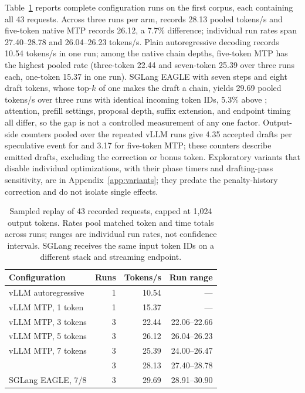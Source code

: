 Table~\ref{tab:request-replay} reports complete configuration runs on the first corpus, each containing all 43 requests. Across three runs per arm, \sys{} records 28.13 pooled tokens/s and five-token native MTP records 26.12, a 7.7\% difference; individual run rates span 27.40--28.78 and 26.04--26.23 tokens/s. Plain autoregressive decoding records 10.54 tokens/s in one run; among the native chain depths, five-token MTP has the highest pooled rate (three-token 22.44 and seven-token 25.39 over three runs each, one-token 15.37 in one run). SGLang EAGLE with seven steps and eight draft tokens, whose top-$k$ of one makes the draft a chain, yields 29.69 pooled tokens/s over three runs with identical incoming token IDs, 5.3\% above \sys{}; attention, prefill settings, proposal depth, suffix extension, and endpoint timing all differ, so the gap is not a controlled measurement of any one factor. Output-side counters pooled over the repeated vLLM runs give 4.35 accepted drafts per speculative event for \sys{} and 3.17 for five-token MTP; these counters describe emitted drafts, excluding the correction or bonus token. Exploratory variants that disable individual \sys{} optimizations, with their phase timers and drafting-pass sensitivity, are in Appendix~\ref{app:variants}; they predate the penalty-history correction and do not isolate single effects.

\begin{table}[t]
\caption{Sampled replay of 43 recorded requests, capped at 1,024 output tokens. Rates pool matched token and time totals across runs; ranges are individual run rates, not confidence intervals. SGLang receives the same input token IDs on a different stack and streaming endpoint.}
\label{tab:request-replay}
\centering\small
\begin{tabular}{@{}lrrr@{}}
\toprule
Configuration & Runs & Tokens/s & Run range \\
\midrule
vLLM autoregressive & 1 & 10.54 & --- \\
vLLM MTP, 1 token & 1 & 15.37 & --- \\
vLLM MTP, 3 tokens & 3 & 22.44 & 22.06--22.66 \\
vLLM MTP, 5 tokens & 3 & 26.12 & 26.04--26.23 \\
vLLM MTP, 7 tokens & 3 & 25.39 & 24.00--26.47 \\
\sys{} & 3 & 28.13 & 27.40--28.78 \\
\midrule
SGLang EAGLE, 7/8 & 3 & 29.69 & 28.91--30.90 \\
\bottomrule
\end{tabular}
\end{table}

